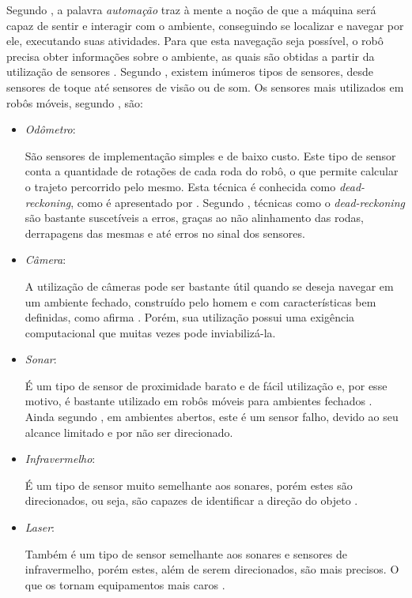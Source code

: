 Segundo \cite{roboticaIndustrial}, a palavra \textit{automação} traz à mente a noção de que a máquina será capaz de sentir e interagir com o ambiente, conseguindo se localizar e navegar por ele, executando suas atividades. Para que esta navegação seja possível, o robô precisa obter informações sobre o ambiente, as quais são obtidas a partir da utilização de sensores \cite{simpleMobile}. Segundo \cite{agenteExploratorioKalman}, existem inúmeros tipos de sensores, desde sensores de toque até sensores de visão ou de som. Os sensores mais utilizados em robôs móveis, segundo \cite{agenteExploratorioKalman}, são:
\begin{itemize}
	\item \textit{Odômetro}:

		São sensores de implementação simples e de baixo custo. Este tipo de sensor conta a quantidade de rotações de cada roda do robô, o que permite calcular o trajeto percorrido pelo mesmo. Esta técnica é conhecida como \textit{dead-reckoning}, como é apresentado por \cite{integrationVisionSLAMnonlinear}. Segundo \cite{agenteExploratorioKalman}, técnicas como o \textit{dead-reckoning} são bastante suscetíveis a erros, graças ao não alinhamento das rodas, derrapagens das mesmas e até erros no sinal dos sensores.

	\item \textit{Câmera}:

		A utilização de câmeras pode ser bastante útil quando se deseja navegar em um ambiente fechado, construído pelo homem e com características bem definidas, como afirma \cite{agenteExploratorioKalman}. Porém, sua utilização possui uma exigência computacional \cite{localizacaoEMapeamentoPaulo} que muitas vezes pode inviabilizá-la.

	\item \textit{Sonar}:

		É um tipo de sensor de proximidade barato e de fácil utilização e, por esse motivo, é bastante utilizado em robôs móveis para ambientes fechados \cite{agenteExploratorioKalman}. Ainda segundo \cite{agenteExploratorioKalman}, em ambientes abertos, este é um sensor falho, devido ao seu alcance limitado e por não ser direcionado.

	\item \textit{Infravermelho}:

		É um tipo de sensor muito semelhante aos sonares, porém estes são direcionados, ou seja, são capazes de identificar a direção do objeto \cite{theCleaningProject}.

	\item \textit{Laser}:

		Também é um tipo de sensor semelhante aos sonares e sensores de infravermelho, porém estes, além de serem direcionados, são mais precisos. O que os tornam equipamentos mais caros \cite{agenteExploratorioKalman}.

\end{itemize}

